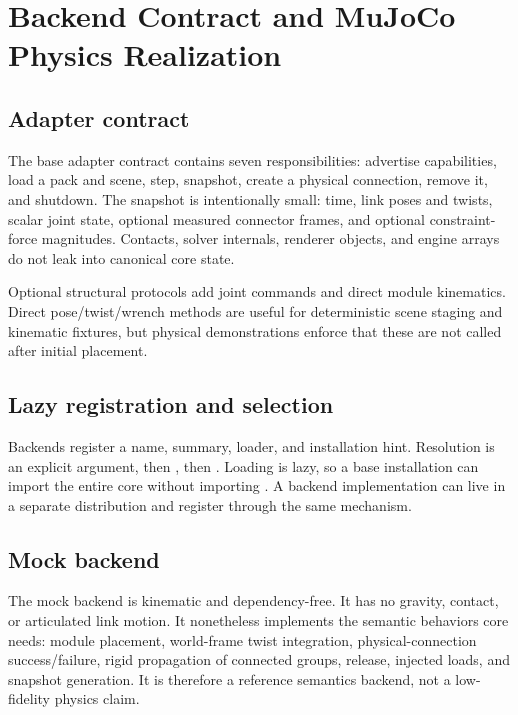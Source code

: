 \section{Backend Contract and MuJoCo Physics Realization}
\label{sec:backends}

\subsection{Adapter contract}

The base adapter contract contains seven responsibilities: advertise capabilities,
load a pack and scene, step, snapshot, create a physical connection, remove it, and
shutdown. The snapshot is intentionally small: time, link poses and twists, scalar
joint state, optional measured connector frames, and optional constraint-force
magnitudes. Contacts, solver internals, renderer objects, and engine arrays do not leak
into canonical core state.

Optional structural protocols add joint commands and direct module kinematics. Direct
pose/twist/wrench methods are useful for deterministic scene staging and kinematic
fixtures, but physical demonstrations enforce that these are not called after initial
placement.

\subsection{Lazy registration and selection}

Backends register a name, summary, loader, and installation hint. Resolution is an
explicit argument, then , then . Loading is lazy, so a
base installation can import the entire core without importing \mujoco{}. A backend
implementation can live in a separate distribution and register through the same
mechanism.

\subsection{Mock backend}

The mock backend is kinematic and dependency-free. It has no gravity, contact, or
articulated link motion. It nonetheless implements the semantic behaviors core needs:
module placement, world-frame twist integration, physical-connection success/failure,
rigid propagation of connected groups, release, injected loads, and snapshot
generation. It is therefore a reference semantics backend, not a low-fidelity physics
claim.

